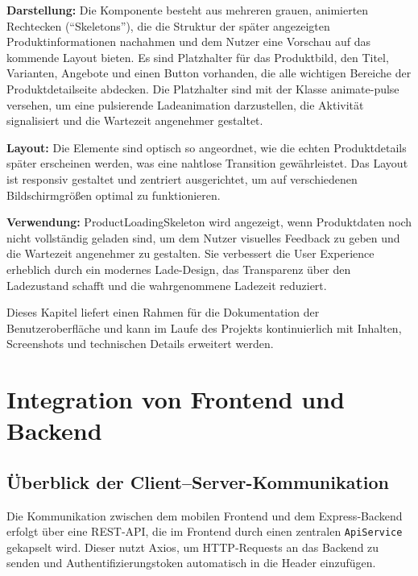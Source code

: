 \documentclass[12pt, a4paper]{report} %
\newcommand{\authorinitials}{} %
\begin{document}
\textbf{Darstellung:}
Die Komponente besteht aus mehreren grauen, animierten Rechtecken (``Skeletons''), die die Struktur der später angezeigten Produktinformationen nachahmen und dem Nutzer eine Vorschau auf das kommende Layout bieten. Es sind Platzhalter für das Produktbild, den Titel, Varianten, Angebote und einen Button vorhanden, die alle wichtigen Bereiche der Produktdetailseite abdecken. Die Platzhalter sind mit der Klasse animate-pulse versehen, um eine pulsierende Ladeanimation darzustellen, die Aktivität signalisiert und die Wartezeit angenehmer gestaltet.

\textbf{Layout:}
Die Elemente sind optisch so angeordnet, wie die echten Produktdetails später erscheinen werden, was eine nahtlose Transition gewährleistet. Das Layout ist responsiv gestaltet und zentriert ausgerichtet, um auf verschiedenen Bildschirmgrößen optimal zu funktionieren.

\noindent\textbf{Verwendung:} ProductLoadingSkeleton wird angezeigt, wenn Produktdaten noch nicht vollständig geladen sind, um dem Nutzer visuelles Feedback zu geben und die Wartezeit angenehmer zu gestalten. Sie verbessert die User Experience erheblich durch ein modernes Lade-Design, das Transparenz über den Ladezustand schafft und die wahrgenommene Ladezeit reduziert.

\vspace{1em}
\noindent
Dieses Kapitel liefert einen Rahmen für die Dokumentation der Benutzeroberfläche und kann im Laufe des Projekts kontinuierlich mit Inhalten, Screenshots und technischen Details erweitert werden.

\chapter{Integration von Frontend und Backend}
\renewcommand{\authorinitials}{DH}

\label{chap:integration}

\section{Überblick der Client–Server-Kommunikation}
Die Kommunikation zwischen dem mobilen Frontend und dem Express‑Backend erfolgt über eine REST‑API, die im Frontend durch einen zentralen \texttt{ApiService} gekapselt wird. Dieser nutzt Axios, um HTTP‑Requests an das Backend zu senden und Authentifizierungs­token automatisch in die Header einzufügen.
\end{document}
